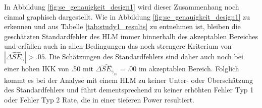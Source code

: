 \documentclass[12pt, a4paper]{article}\usepackage[]{graphicx}\usepackage[]{color}
\begin{document}
In Abbildung \ref{fig:se_genauigkeit_design1} wird dieser Zusammenhang noch einmal graphisch dargestellt. Wie in Abbildung \ref{fig:se_genauigkeit_design1} zu erkennen und aus Tabelle \ref{tab:study1_results} zu entnehmen ist, bleiben die geschätzten Standardfehler des HLM immer hinnerhalb des akzeptablen Bereiches und erfüllen auch in allen Bedingungen das noch strengere Kriterium von $|\Delta\widehat{SE}_{\widehat{\gamma}}| > .05$. Die Schätzungen des Standardfehlers sind daher auch noch bei einer hohen IKK von .50 mit $\Delta\widehat{SE}_{\widehat{\gamma}_{10}} = .00$ im akzeptablen Bereich. Folglich kommt es bei der Analyse mit einem HLM zu keiner Unter- oder Überschätzung des Standardfehlers und führt dementsprechend zu keiner erhöhten Fehler Typ 1 oder Fehler Typ 2 Rate, die in einer tieferen Power resultiert.
\end{document}
